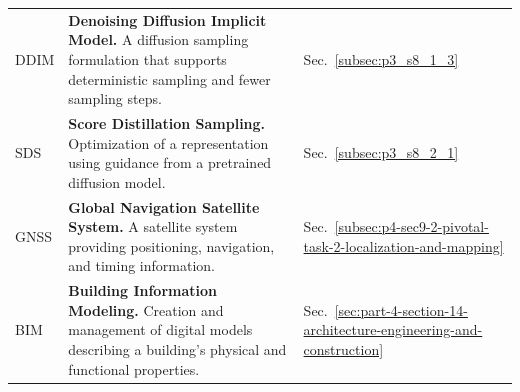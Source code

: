 \begin{longtable}{lll}
    DDIM & \textbf{Denoising Diffusion Implicit Model.} A diffusion sampling formulation that supports deterministic sampling and fewer sampling steps. & Sec.~\ref{subsec:p3_s8_1_3} \\
    
    SDS & \textbf{Score Distillation Sampling.} Optimization of a representation using guidance from a pretrained diffusion model. & Sec.~\ref{subsec:p3_s8_2_1} \\
    
    GNSS & \textbf{Global Navigation Satellite System.} A satellite system providing positioning, navigation, and timing information. & Sec.~\ref{subsec:p4-sec9-2-pivotal-task-2-localization-and-mapping} \\
    
    BIM & \textbf{Building Information Modeling.} Creation and management of digital models describing a building's physical and functional properties. & Sec.~\ref{sec:part-4-section-14-architecture-engineering-and-construction} \\
\end{longtable}
